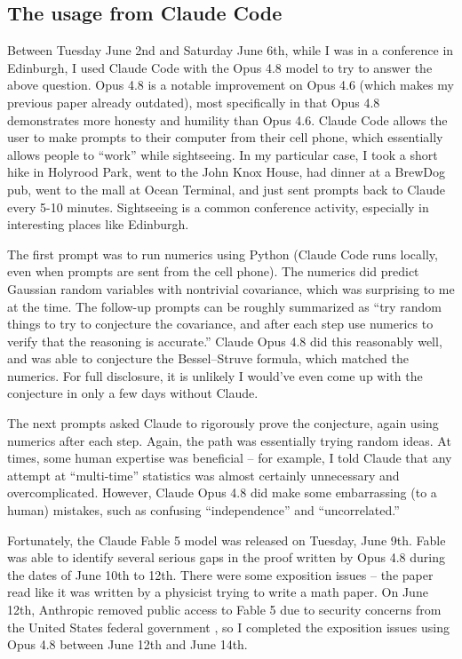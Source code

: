 \documentclass{article}
\begin{document}
\subsection{The usage from Claude Code}

Between Tuesday June 2nd and Saturday June 6th, while I was in a conference in Edinburgh, I used Claude Code with the Opus 4.8 model to try to answer the above question. Opus 4.8 is a notable improvement on Opus 4.6 (which makes my previous paper \cite{Kuan2026} already outdated), most specifically in that Opus 4.8 demonstrates more honesty and humility than Opus 4.6. Claude Code allows the user to make prompts to their computer from their cell phone, which essentially allows people to ``work'' while sightseeing. In my particular case, I took a short hike in Holyrood Park, went to the John Knox House, had dinner at a BrewDog pub, went to the mall at Ocean Terminal, and just sent prompts back to Claude every 5-10 minutes. Sightseeing is a common conference activity, especially in interesting places like Edinburgh.

The first prompt was to run numerics using Python (Claude Code runs locally, even when prompts are sent from the cell phone). The numerics did predict Gaussian random variables with nontrivial covariance, which was surprising to me at the time. The follow-up prompts can be roughly summarized as ``try random things to try to conjecture the covariance, and after each step use numerics to verify that the reasoning is accurate.'' Claude Opus 4.8 did this reasonably well, and was able to conjecture the Bessel--Struve formula, which matched the numerics. For full disclosure, it is unlikely I would've even come up with the conjecture in only a few days without Claude. 

The next prompts asked Claude to rigorously prove the conjecture, again using numerics after each step. Again, the path was essentially trying random ideas. At times, some human expertise was beneficial -- for example, I told Claude that any attempt at ``multi-time'' statistics was almost certainly unnecessary and overcomplicated. However, Claude Opus 4.8 did make some embarrassing (to a human) mistakes, such as confusing ``independence'' and ``uncorrelated.'' 

Fortunately, the Claude Fable 5 model was released on Tuesday, June 9th. Fable was able to identify several serious gaps in the proof written by Opus 4.8 during the dates of June 10th to 12th. There were some exposition issues -- the paper read like it was written by a physicist trying to write a math paper. On June 12th, Anthropic removed public access to Fable 5 due to security concerns from the United States federal government \cite{Anthropic}, so I completed the exposition issues using Opus 4.8 between June 12th and June 14th. 
\end{document}
